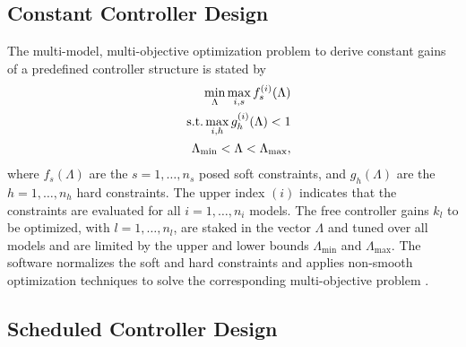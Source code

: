 \documentclass[aerospace,article,submit,moreauthors,pdftex,10pt,a4paper]{Definitions/mdpi}
\begin{document}
\subsection{Constant Controller Design}

The multi-model, multi-objective optimization problem  to derive constant gains of a predefined controller structure \cite{Apkarian14}  is stated by
\begin{eqnarray}\label{eq:problem1}
&&\min_\Lambda \max_{i,s} f_{s}^{(i)}(\Lambda) \\
&&\textnormal{s.t.} \max_{i,h} g_{h}^{(i)}(\Lambda) < 1 \nonumber \\
&& \Lambda_{\min} < \Lambda < \Lambda_{\max}, \nonumber 
\end{eqnarray}
where $f_{s}(\Lambda)$ are the $s=1,\dots,n_s$ posed soft constraints, and  $g_{h}(\Lambda)$ are the  $h=1,\dots,n_h$ hard constraints. The upper index $(i)$ indicates that the constraints are evaluated for all  $i= 1,\dots, n_i$ models.
The free controller gains $k_l$ to be optimized, with $l=1,\dots,n_l$,  are staked in the vector $\Lambda$ and tuned over all models and are limited by the upper and lower bounds $\Lambda_{\min}$ and $\Lambda_{\max}$. The software normalizes the soft and hard constraints and applies non-smooth optimization techniques to solve the corresponding multi-objective problem  \cite{Apkarian06}.



\subsection{Scheduled Controller Design}
\end{document}

